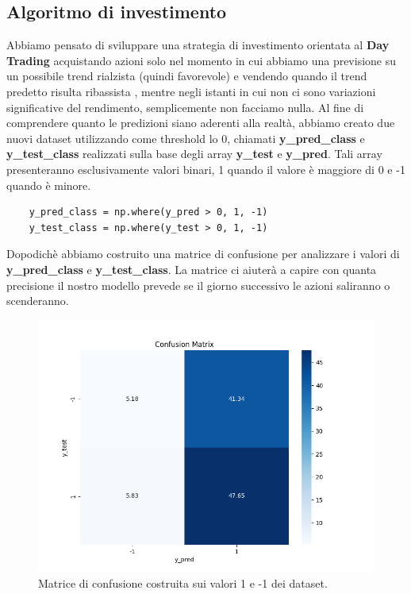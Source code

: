 \documentclass{article}
\begin{document}
\subsection{Algoritmo di investimento}
\label{subsec:algorithm}
Abbiamo pensato di sviluppare una strategia di investimento orientata al \textbf{Day Trading} acquistando azioni solo nel momento in cui abbiamo una previsione su un possibile trend rialzista (quindi favorevole) e vendendo quando il trend predetto risulta ribassista , mentre negli istanti in cui non ci sono variazioni significative del rendimento, semplicemente non facciamo nulla.
Al fine di comprendere quanto le predizioni siano aderenti alla realtà, abbiamo creato due nuovi dataset utilizzando come threshold lo 0, chiamati \textbf{y\_pred\_class} e \textbf{y\_test\_class} realizzati sulla base degli array \textbf{y\_test} e \textbf{y\_pred}. Tali array presenteranno esclusivamente valori binari, 1 quando il valore è maggiore di 0 e -1 quando è minore.
\begin{verbatim} 
    y_pred_class = np.where(y_pred > 0, 1, -1)
    y_test_class = np.where(y_test > 0, 1, -1)
\end{verbatim}
Dopodichè abbiamo costruito una matrice di confusione per analizzare i valori di \textbf{y\_pred\_class} e \textbf{y\_test\_class}. La matrice ci aiuterà a capire con quanta precisione il nostro modello prevede se il giorno successivo le azioni saliranno o scenderanno.
\begin{figure}[H]
    \centering
    \includegraphics[width=1\linewidth]{confusionMatrix.png}
    \caption{\label{fig:confusionMatrix} Matrice di confusione costruita sui valori 1 e -1 dei dataset.}
\end{figure}
\end{document}

